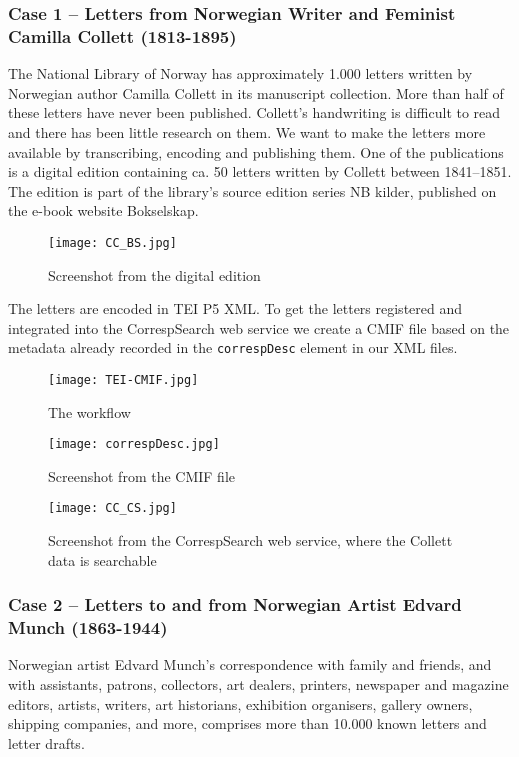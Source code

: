 \documentclass[runningheads]{llncs}
\begin{document}
\subsubsection{Case 1 -- Letters from Norwegian Writer and Feminist
Camilla Collett
(1813-1895)}
The National Library of Norway has approximately 1.000 letters written
by  Norwegian author Camilla Collett in its manuscript
collection. More than half of these letters have never been published.
Collett's handwriting is difficult to read and there has been little
research on them. We want to make the letters more
available by transcribing, encoding and publishing them. One of the
publications is a digital edition containing ca. 50 letters
written by Collett between 1841–1851. The edition is part of the
library's source edition series NB kilder, published on the e-book
website Bokselskap.~\cite{url_boks}

\begin{figure}
\texttt{[image: CC\_BS.jpg]}
\caption{Screenshot from the digital edition} \label{fig1}
\end{figure}

The letters are encoded in TEI P5 XML. To get the letters registered and
integrated into the CorrespSearch web service we create a CMIF file
based on the metadata already recorded in the \texttt{correspDesc}
element in our XML files.

\begin{figure}
\texttt{[image: TEI-CMIF.jpg]}
\caption{The workflow} \label{fig2}
\end{figure}

\begin{figure}
\texttt{[image: correspDesc.jpg]}
\caption{Screenshot from the CMIF file} \label{fig3}
\end{figure}

\begin{figure}
\texttt{[image: CC\_CS.jpg]}
\caption{Screenshot from the CorrespSearch web service, where the Collett data is searchable} \label{fig4}
\end{figure}

\subsubsection{Case 2 -- Letters to and from Norwegian Artist Edvard
Munch (1863-1944)}
Norwegian artist Edvard Munch's correspondence with family and friends,
and with assistants, patrons, collectors, art dealers, printers,
newspaper and magazine editors, artists, writers, art historians,
exhibition organisers, gallery owners, shipping companies, and more,
comprises more than 10.000 known letters and letter drafts.
\end{document}
